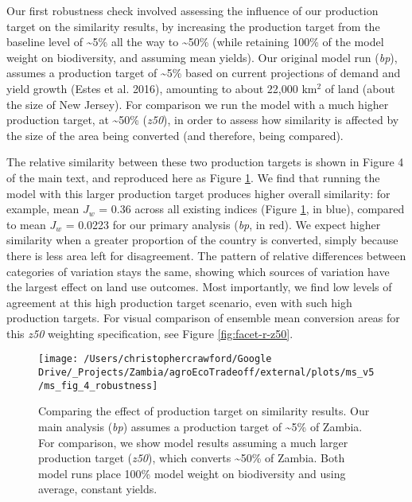 \documentclass[
]{article}
\begin{document}
Our first robustness check involved assessing the influence of our production target on the similarity results, by increasing the production target from the baseline level of \textasciitilde5\% all the way to \textasciitilde50\% (while retaining 100\% of the model weight on biodiversity, and assuming mean yields). Our original model run (\emph{bp}), assumes a production target of \textasciitilde5\% based on current projections of demand and yield growth (Estes et al. 2016), amounting to about 22,000 km\(^2\) of land (about the size of New Jersey). For comparison we run the model with a much higher production target, at \textasciitilde50\% (\emph{z50}), in order to assess how similarity is affected by the size of the area being converted (and therefore, being compared).

The relative similarity between these two production targets is shown in Figure 4 of the main text, and reproduced here as Figure \ref{fig:z50-bp-comparison}. We find that running the model with this larger production target produces higher overall similarity: for example, mean \(J_w\) = 0.36 across all existing indices (Figure \ref{fig:z50-bp-comparison}, in blue), compared to mean \(J_w\) = 0.0223 for our primary analysis (\emph{bp}, in red). We expect higher similarity when a greater proportion of the country is converted, simply because there is less area left for disagreement. The pattern of relative differences between categories of variation stays the same, showing which sources of variation have the largest effect on land use outcomes. Most importantly, we find low levels of agreement at this high production target scenario, even with such high production targets. For visual comparison of ensemble mean conversion areas for this \emph{z50} weighting specification, see Figure \ref{fig:facet-r-z50}.



\begin{figure}
\texttt{[image: /Users/christophercrawford/Google Drive/\_Projects/Zambia/agroEcoTradeoff/external/plots/ms\_v5/ms\_fig\_4\_robustness]} \caption{Comparing the effect of production target on similarity results. Our main analysis (\emph{bp}) assumes a production target of \textasciitilde5\% of Zambia. For comparison, we show model results assuming a much larger production target (\emph{z50}), which converts \textasciitilde50\% of Zambia. Both model runs place 100\% model weight on biodiversity and using average, constant yields.}\label{fig:z50-bp-comparison}
\end{figure}
\end{document}
